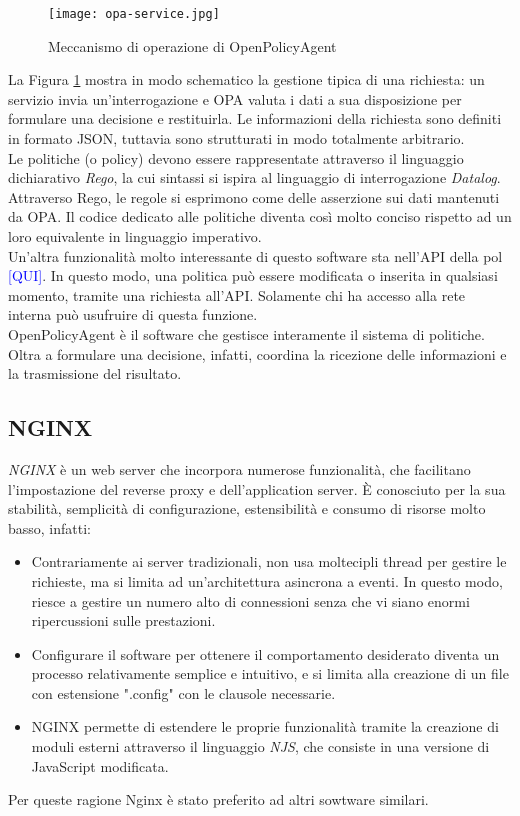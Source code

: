 \begin{figure}[h]
    \texttt{[image: opa-service.jpg]}
    \centering
    \caption{Meccanismo di operazione di OpenPolicyAgent}
    \label{OPAWork}
\end{figure} 
La Figura \ref*{OPAWork} mostra in modo schematico la gestione tipica di una richiesta: un servizio invia un'interrogazione
 e OPA valuta i dati a sua disposizione per formulare una decisione e restituirla. 
Le informazioni della richiesta sono definiti in formato JSON, tuttavia sono strutturati in modo totalmente arbitrario. 
\\ Le politiche (o policy) devono essere rappresentate attraverso il linguaggio dichiarativo 
\textit{Rego}, la cui sintassi si ispira al linguaggio 
di interrogazione \textit{Datalog}. 
Attraverso Rego, le regole si esprimono come delle asserzione sui dati mantenuti da OPA.
Il codice dedicato alle politiche diventa così molto conciso rispetto ad un loro equivalente in 
linguaggio imperativo. 
\\ Un'altra funzionalità molto interessante di questo software sta nell'API della pol \textcolor{blue}{[QUI]}. In questo modo, una politica può essere modificata o inserita 
in qualsiasi momento, tramite una richiesta all'API. Solamente chi ha accesso alla rete interna può usufruire di questa funzione. 
\\ OpenPolicyAgent è il software che gestisce interamente il sistema di politiche. Oltra a formulare una decisione,
 infatti, coordina la ricezione delle informazioni e la trasmissione del risultato.  


\subsection{NGINX}
\textit{NGINX} è un web server che incorpora numerose funzionalità, che facilitano l'impostazione del reverse proxy e dell'application server. 
È conosciuto per la sua stabilità, semplicità di configurazione, estensibilità e consumo di risorse molto basso, infatti:
\begin{itemize}
    \item 
    Contrariamente ai server tradizionali,  
    non usa moltecipli thread per gestire le richieste, ma si limita ad un'architettura asincrona a eventi. 
    In questo modo, riesce a gestire un numero alto di connessioni senza che vi siano enormi ripercussioni sulle prestazioni. 
    
    \item Configurare il software per ottenere il comportamento desiderato diventa un processo relativamente semplice e intuitivo, e si
    limita alla creazione di un file con estensione ".config" con le clausole necessarie. 
    \item NGINX permette di estendere le proprie funzionalità tramite la creazione di moduli esterni attraverso il linguaggio \textit{NJS}, 
    che consiste in una versione di JavaScript modificata. 
\end{itemize}
Per queste ragione Nginx è stato preferito ad altri sowtware similari.


